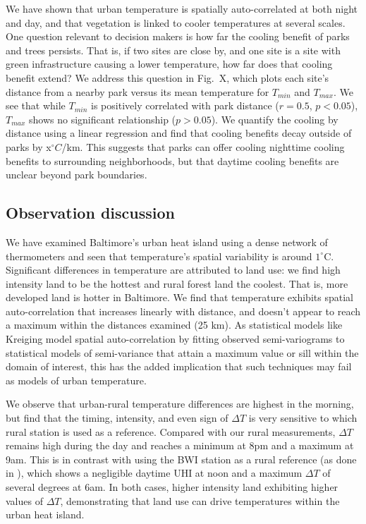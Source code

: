 \documentclass[draft,linenumbers]{agujournal}
\begin{document}
We have shown that urban temperature is spatially auto-correlated at both night and day, and that vegetation is linked to cooler temperatures at several scales. One question relevant to decision makers is how far the cooling benefit of parks and trees persists. That is, if two sites are close by, and one site is a site with green infrastructure causing a lower temperature, how far does that cooling benefit extend? We address this question in Fig.~X, which plots each site's distance from a nearby park versus its mean temperature for $T_{min}$ and $T_{max}$. We see that while $T_{min}$ is positively correlated with park distance ($r=0.5$, $p< 0.05$), $T_{max}$ shows no significant relationship ($p>0.05$).  We quantify the cooling by distance using a linear regression and find that cooling benefits decay outside of parks by x$^\circ C$/km. This suggests that parks can offer cooling nighttime cooling benefits to surrounding neighborhoods, but that daytime cooling benefits are unclear beyond park boundaries. 

\subsection{Observation discussion}
We have examined Baltimore's urban heat island using a dense network of thermometers and seen that temperature's spatial variability is around $1^\circ$C. Significant differences in temperature are attributed to land use: we find high intensity land to be the hottest and rural forest land the coolest. That is, more developed land is hotter in Baltimore. We find that temperature exhibits spatial auto-correlation that increases linearly with distance, and doesn't appear to reach a maximum within the distances examined (25 km). As statistical models like Kreiging model spatial auto-correlation by fitting observed semi-variograms to statistical models of semi-variance that attain a maximum value or sill within the domain of interest, this has the added implication that such techniques may fail as models of urban temperature. 

We observe that urban-rural temperature differences are highest in the morning, but find that the timing, intensity, and even sign of $\Delta T$ is very sensitive to which rural station is used as a reference. Compared with our rural measurements,  $\Delta T$ remains high during the day and reaches a minimum at 8pm and a maximum at 9am. This is in contrast with using the BWI station as a rural reference (as done in \citep{lisyngeristic2003}), which shows  a negligible daytime UHI at noon and a maximum $\Delta T$ of several degrees at 6am. In both cases, higher intensity land exhibiting higher values of $\Delta T$, demonstrating that land use can drive temperatures within the urban heat island.
\end{document}
